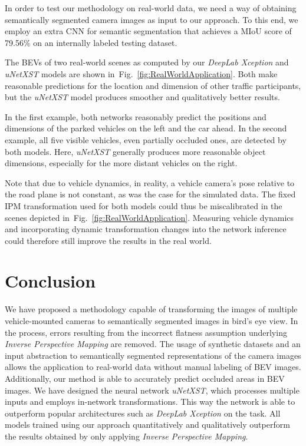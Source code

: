\documentclass[a4paper, 10pt, conference]{ieeeconf}
\newcommand{\fig}[1]{Fig.~\ref{#1}}
\begin{document}
In order to test our methodology on real-world data, we need a way of obtaining semantically segmented camera images as input to our approach. To this end, we employ an extra CNN for semantic segmentation that achieves a MIoU score of \num{79.56}{\%} on an internally labeled testing dataset.

The BEVs of two real-world scenes as computed by our \textit{DeepLab Xception} and \textit{uNetXST} models are shown in~\fig{fig:RealWorldApplication}. Both make reasonable predictions for the location and dimension of other traffic participants, but the \textit{uNetXST} model produces smoother and qualitatively better results.

In the first example, both networks reasonably predict the positions and dimensions of the parked vehicles on the left and the car ahead. In the second example, all five visible vehicles, even partially occluded ones, are detected by both models. Here, \textit{uNetXST} generally produces more reasonable object dimensions, especially for the more distant vehicles on the right.

Note that due to vehicle dynamics, in reality, a vehicle camera's pose relative to the road plane is not constant, as was the case for the simulated data. The fixed IPM transformation used for both models could thus be miscalibrated in the scenes depicted in~\fig{fig:RealWorldApplication}. Measuring vehicle dynamics and incorporating dynamic transformation changes into the network inference could therefore still improve the results in the real world.


\section{Conclusion}

We have proposed a methodology capable of transforming the images of multiple vehicle-mounted cameras to semantically segmented images in bird's eye view. In the process, errors resulting from the incorrect flatness assumption underlying \textit{Inverse Perspective Mapping} are removed. The usage of synthetic datasets and an input abstraction to semantically segmented representations of the camera images allows the application to real-world data without manual labeling of BEV images. Additionally, our method is able to accurately predict occluded areas in BEV images. We have designed the neural network \textit{uNetXST}, which processes multiple inputs and employs in-network transformations. This way the network is able to outperform popular architectures such as \textit{DeepLab Xception} on the task. All models trained using our approach quantitatively and qualitatively outperform the results obtained by only applying \textit{Inverse Perspective Mapping}.
\end{document}
